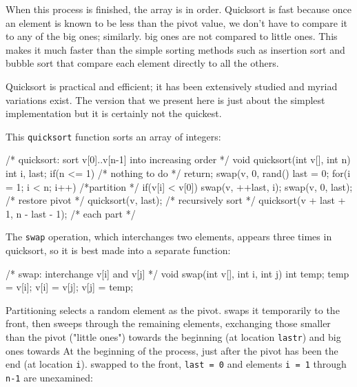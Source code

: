 When this process is finished, the array is in order. Quicksort is fast
because once an element is known to be less than the pivot value, we don't
have to compare it to any of the big ones; similarly. big ones are not
compared to little ones. This makes it much faster than the simple sorting
methods such as insertion sort and bubble sort that compare each element
directly to all the others.

Quicksort is practical and efficient; it has been extensively studied and
myriad variations exist. The version that we present here is just about the
simplest implementation but it is certainly not the quickest.

This \verb'quicksort' function sorts an array of integers:
\begin{wellcode}
    /* quicksort: sort v[0]..v[n-1] into increasing order */
    void quicksort(int v[], int n)
    {
        int i, last;
        if(n <= 1) /* nothing to do */
        {
            return;
        }
        swap(v, 0, rand() %
        last = 0;
        for(i = 1; i < n; i++)  /*partition */
        {
            if(v[i] < v[0])
            {
                swap(v, ++last, i);
            }
            swap(v, 0, last);   /* restore pivot */
            quicksort(v, last); /* recursively sort */
            quicksort(v + last + 1, n - last - 1); /* each part */
        }
    }
\end{wellcode}

The \verb'swap' operation, which interchanges two elements, appears three
times in quicksort, so it is best made into a separate function:
\begin{wellcode}
    /* swap: interchange v[i] and v[j] */
    void swap(int v[], int i, int j)
    {
        int temp;
        temp = v[i];
        v[i] = v[j];
        v[j] = temp;
    }
\end{wellcode}

Partitioning selects a random element as the pivot. swaps it temporarily to
the front, then sweeps through the remaining elements, exchanging those
smaller than the pivot ("little ones") towards the beginning (at location
\verb'lastr') and big ones towards At the beginning of the process, just
after the pivot has been the end (at location \verb'i').  swapped to the
front, \verb'last = 0' and elements \verb'i = 1' through \verb'n-1' are
unexamined:
\begin{figure}[h]
    \centering
{}
\end{figure}

